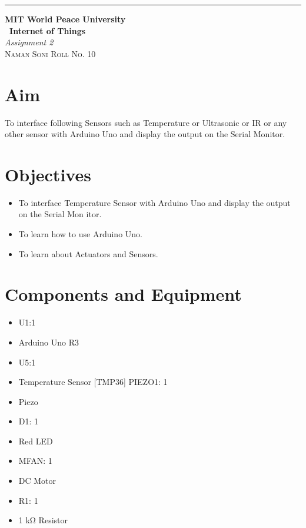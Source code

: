 \documentclass{article}
\begin{document}
\begin{titlepage} %
	
	\raggedleft\rule{1pt}{\textheight} %
	\hspace{0.05\textwidth} %
	\parbox[b]{0.75\textwidth}
	{ %
		
		{\Huge\bfseries MIT World Peace University \\[0.5\baselineskip] \ Internet of Things}\\[2\baselineskip] %
		{\large\textit{Assignment 2}}\\[4\baselineskip] %
		{\Large\textsc{Naman Soni Roll No. 10}} %
		
		\vspace{0.5\textheight} %
	}
	
\end{titlepage}
\tableofcontents
\pagebreak
\section{\textbf{Aim}}
To interface following Sensors such as Temperature or Ultrasonic or IR or any other sensor with Arduino Uno and display the output on the Serial Monitor.
\section{\textbf{Objectives}}
\begin{itemize}
	\item  To interface Temperature Sensor with Arduino Uno and display the output on the Serial Mon itor.
	\item To learn how to use Arduino Uno.
	\item To learn about Actuators and Sensors.
\end{itemize}
\section{\textbf{Components and Equipment}}
\begin{itemize}
	\item  U1:1   
	\item Arduino Uno R3
	\item U5:1
	\item Temperature Sensor [TMP36] PIEZO1: 1
	\item Piezo
	\item D1: 1
	\item Red LED
	\item MFAN: 1
	\item DC Motor
	\item R1: 1
	\item 1 kΩ Resistor
\end{itemize}
\end{document}
